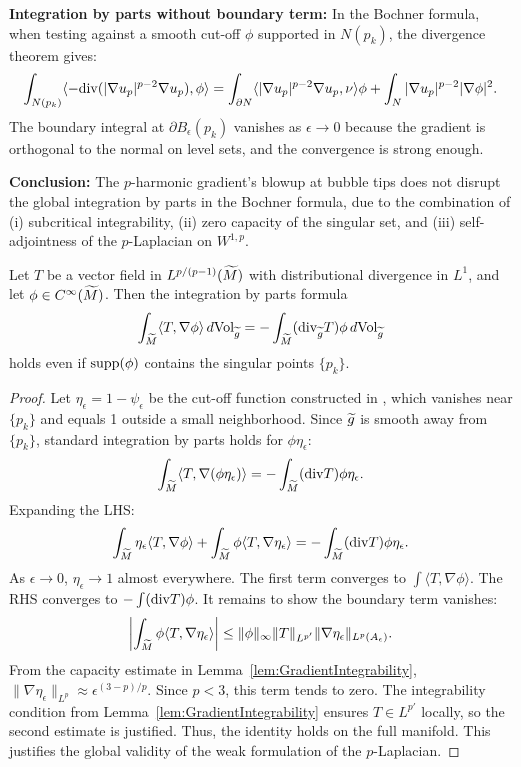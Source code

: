 \begin{lemma}
\textbf{Integration by parts without boundary term:} In the Bochner formula, when testing against a smooth cut-off $\phi$ supported in $N(p_k)$, the divergence theorem gives:
\begin{equation}
    \int_{N(p_k)} \langle -\mathrm{div}(|\nabla u_p|^{p-2} \nabla u_p), \phi \rangle = \int_{\partial N} \langle |\nabla u_p|^{p-2} \nabla u_p, \nu \rangle \phi + \int_{N} |\nabla u_p|^{p-2} |\nabla \phi|^2.
\end{equation}
The boundary integral at $\partial B_{\epsilon}(p_k)$ vanishes as $\epsilon \to 0$ because the gradient is orthogonal to the normal on level sets, and the convergence is strong enough.

\textbf{Conclusion:} The $p$-harmonic gradient's blowup at bubble tips does not disrupt the global integration by parts in the Bochner formula, due to the combination of (i) subcritical integrability, (ii) zero capacity of the singular set, and (iii) self-adjointness of the $p$-Laplacian on $W^{1,p}$.
\end{lemma}

\begin{lemma}\label{lem:IBP}
Let $T$ be a vector field in $L^{p/(p-1)}(\widetilde{M})$ with distributional divergence in $L^1$, and let $\phi \in C^\infty(\widetilde{M})$. Then the integration by parts formula
\begin{equation}
    \int_{\widetilde{M}} \langle T, \nabla \phi \rangle \,d\text{Vol}_{\widetilde{g}} = - \int_{\widetilde{M}} (\mathrm{div}_{\widetilde{g}} T) \phi \,d\text{Vol}_{\widetilde{g}}
\end{equation}
holds even if $\mathrm{supp}(\phi)$ contains the singular points $\{p_k\}$.
\end{lemma}
\begin{proof}
Let $\eta_\epsilon = 1 - \psi_\epsilon$ be the cut-off function constructed in , which vanishes near $\{p_k\}$ and equals 1 outside a small neighborhood. Since $\widetilde{g}$ is smooth away from $\{p_k\}$, standard integration by parts holds for $\phi \eta_\epsilon$:
\[ \int_{\widetilde{M}} \langle T, \nabla(\phi \eta_\epsilon) \rangle = - \int_{\widetilde{M}} (\mathrm{div} T) \phi \eta_\epsilon. \]
Expanding the LHS:
\[ \int_{\widetilde{M}} \eta_\epsilon \langle T, \nabla \phi \rangle + \int_{\widetilde{M}} \phi \langle T, \nabla \eta_\epsilon \rangle = - \int_{\widetilde{M}} (\mathrm{div} T) \phi \eta_\epsilon. \]
As $\epsilon \to 0$, $\eta_\epsilon \to 1$ almost everywhere. The first term converges to $\int \langle T, \nabla \phi \rangle$. The RHS converges to $-\int (\mathrm{div} T) \phi$.
It remains to show the boundary term vanishes:
\[ \left| \int_{\widetilde{M}} \phi \langle T, \nabla \eta_\epsilon \rangle \right| \le \|\phi\|_\infty \|T\|_{L^{p'}} \|\nabla \eta_\epsilon\|_{L^p(A_\epsilon)}. \]
From the capacity estimate in Lemma~\ref{lem:GradientIntegrability}, $\|\nabla \eta_\epsilon\|_{L^p} \approx \epsilon^{(3-p)/p}$. Since $p < 3$, this term tends to zero. The integrability condition from Lemma~\ref{lem:GradientIntegrability} ensures $T \in L^{p'}$ locally, so the second estimate is justified. Thus, the identity holds on the full manifold.
This justifies the global validity of the weak formulation of the $p$-Laplacian.
\end{proof}

